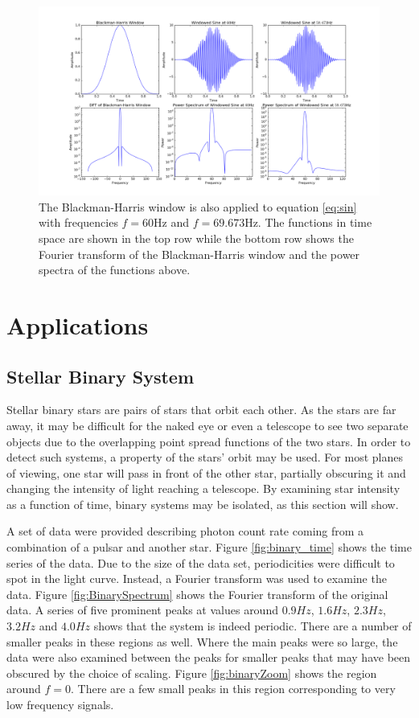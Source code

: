 \message{ !name(Assn2.tex)}\documentclass[twocolumn]{article}
\begin{document}
\begin{figure}
  \includegraphics[width=\linewidth]{blackman_harris.png}
  \caption{
    The Blackman-Harris window is also applied to equation \ref{eq:sin} with
    frequencies $f = 60$Hz and $f = 69.673$Hz. The functions in time space are
    shown in the top row while the bottom row shows the Fourier transform of the
    Blackman-Harris window and the power spectra of the functions above.
  }
  \label{fig:blackman_harris}
\end{figure}


\section{Applications}
\subsection{Stellar Binary System}

Stellar binary stars are pairs of stars that orbit each other. As the stars are far away, it may be difficult for the naked eye or even a telescope to see two separate objects due to the overlapping point spread functions of the two stars. In order to detect such systems, a property of the stars' orbit may be used. For most planes of viewing, one star will pass in front of the other star, partially obscuring it and changing the intensity of light reaching a telescope. By examining star intensity as a function of time, binary systems may be isolated, as this section will show.

A set of data were provided describing photon count rate coming from a combination of a pulsar and another star. Figure \ref{fig:binary_time} shows the time series of the data. Due to the size of the data set, periodicities were difficult to spot in the light curve. Instead, a Fourier transform was used to examine the data. Figure \ref{fig:BinarySpectrum} shows the Fourier transform of the original data. A series of five prominent peaks at values around $0.9Hz$, $1.6Hz$, $2.3Hz$, $3.2Hz$ and $4.0Hz$ shows that the system is indeed periodic. There are a number of smaller peaks in these regions as well.
Where the main peaks were so large, the data were also examined between the peaks for smaller peaks that may have been obscured by the choice of scaling. Figure \ref{fig:binaryZoom} shows the region around $f=0$. There are a few small peaks in this region corresponding to very low frequency signals. 
\end{document}
